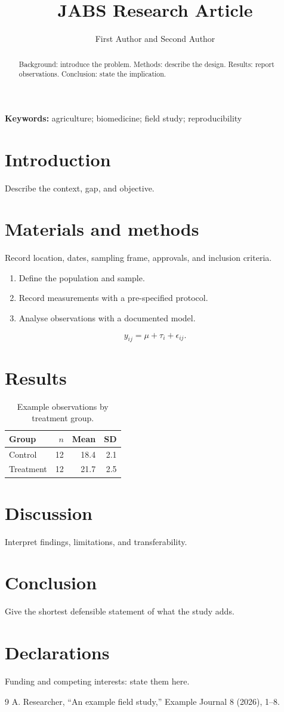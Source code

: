 \documentclass{article}
\title{JABS Research Article}
\author{First Author and Second Author}
\date{}
\begin{document}
\maketitle
\begin{abstract}Background: introduce the problem. Methods: describe the design. Results: report observations. Conclusion: state the implication.\end{abstract}
\noindent\textbf{Keywords:} agriculture; biomedicine; field study; reproducibility
\section{Introduction}Describe the context, gap, and objective.
\section{Materials and methods}Record location, dates, sampling frame, approvals, and inclusion criteria.
\begin{enumerate}[leftmargin=8mm]\item Define the population and sample.\item Record measurements with a pre-specified protocol.\item Analyse observations with a documented model.\end{enumerate}
\begin{equation} y_{ij}=\mu+\tau_i+\epsilon_{ij}. \end{equation}
\section{Results}
\begin{table}[ht]\centering\caption{Example observations by treatment group.}
\begin{tabular}{@{}lrrr@{}}\toprule Group & $n$ & Mean & SD\\\midrule Control & 12 & 18.4 & 2.1\\Treatment & 12 & 21.7 & 2.5\\\bottomrule\end{tabular}\end{table}
\section{Discussion}Interpret findings, limitations, and transferability.
\section{Conclusion}Give the shortest defensible statement of what the study adds.
\section*{Declarations}Funding and competing interests: state them here.
\begin{thebibliography}{9} A. Researcher, ``An example field study,'' Example Journal 8 (2026), 1--8.\end{thebibliography}
\end{document}
